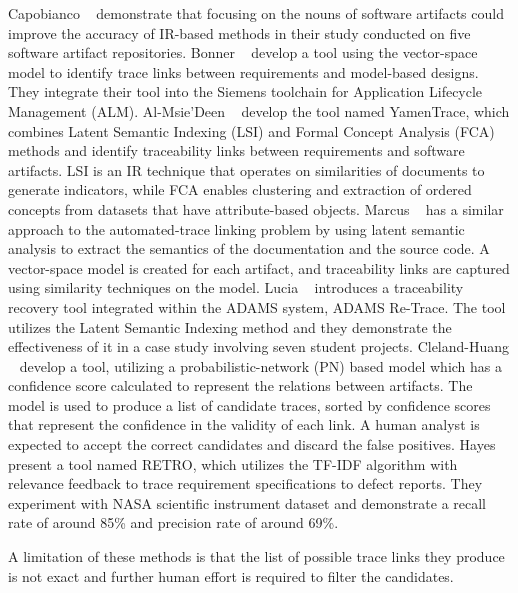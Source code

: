 Capobianco \etal{}~\cite{capobianco-2013} demonstrate that focusing on the nouns of software artifacts could improve the accuracy of IR-based methods in their study conducted on five software artifact repositories.
Bonner \etal{}~\cite{bonner-2023} develop a tool using the vector-space model to identify trace links between requirements and model-based designs. They  integrate their tool into the Siemens toolchain for Application Lifecycle Management (ALM).
Al-Msie'Deen \etal{}~\cite{deen-2023} develop the tool named YamenTrace, which combines Latent Semantic Indexing (LSI) and Formal Concept Analysis (FCA) methods and identify traceability links between requirements and software artifacts. LSI is an IR technique that operates on similarities of documents to generate indicators, while FCA enables clustering and extraction of ordered concepts from datasets that have attribute-based objects. 
Marcus \etal{}~\cite{marcus-2003} has a similar approach to the automated-trace linking problem by using latent semantic analysis to extract the semantics of the documentation and the source code. A vector-space model is created for each artifact, and traceability links are captured using similarity techniques on the model.
Lucia \etal{}~\cite{fasano-2005} introduces a traceability recovery tool integrated within the ADAMS system, ADAMS Re-Trace. The tool utilizes the Latent Semantic Indexing method and they demonstrate the effectiveness of it in a case study involving seven student projects.
Cleland-Huang \etal{}~\cite{cleland-huang-2007} develop a tool, utilizing a probabilistic-network (PN) based model which has a confidence score calculated to represent the relations between artifacts. The model is used to produce a list of candidate traces, sorted by confidence scores that represent the confidence in the validity of each link. A human analyst is expected to accept the correct candidates and discard the false positives. %
Hayes \etal{}~\cite{hayes-2005} present a tool named RETRO, which utilizes the TF-IDF algorithm with relevance feedback to trace requirement specifications to defect reports. They experiment with NASA scientific instrument dataset and demonstrate a recall rate of around 85\% and precision rate of around 69\%.


A limitation of these methods is that the list of possible trace links they produce is not exact and further human effort is required to filter the candidates.

